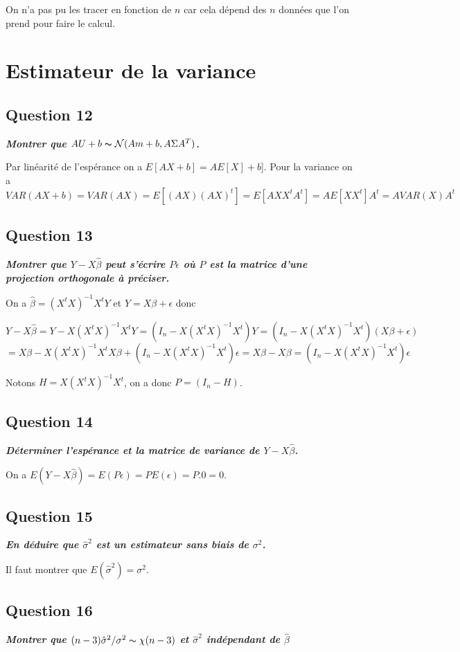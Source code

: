 \documentclass[pdflatex]{article}
\theoremstyle{definition}
\newcommand{\quest}[1]{\textbf{\textit{#1}} \vspace{3mm}}
\begin{document}
\vspace{5mm}
On n'a pas pu les tracer en fonction de $n$ car cela d\'epend des $n$ donn\'ees que l'on prend pour faire le calcul. 

\section*{Estimateur de la variance}
\subsection*{Question 12}
\quest{Montrer que $AU + b \thicksim \mathcal{N}(Am + b, A\Sigma A^T)$.}

Par lin\'earit\'e de l'esp\'erance on a $E[AX+b] = AE[X] + b$]. Pour la variance on a 
$$
VAR(AX+b) = VAR(AX) = E[(AX)(AX)^t] = E[AXX^tA^t] = AE[XX^t]A^t = AVAR(X)A^t
$$

\subsection*{Question 13}
\quest{Montrer que $Y - X\hat{\beta}$ peut s'\'ecrire $P\epsilon$ o\`u $P$ est la matrice d'une projection orthogonale \`a pr\'eciser.}

On a $\hat{\beta} = (X^tX)^{-1}X^tY$ et $Y = X\beta + \epsilon$ donc

$$Y - X\hat{\beta} = Y - X(X^tX)^{-1}X^tY = (I_n - X(X^tX)^{-1}X^t)Y = (I_n - X(X^tX)^{-1}X^t)(X\beta +\epsilon) 
$$
$$
= X\beta - X(X^tX)^{-1}X^tX\beta + (I_n-X(X^tX)^{-1}X^t)\epsilon = X\beta - X\beta = (I_n - X(X^tX)^{-1}X^t)\epsilon
$$

Notons $H = X(X^tX)^{-1}X^t$, on a donc $P = (I_n - H)$.

\subsection*{Question 14}
\quest{D\'eterminer l'esp\'erance et la matrice de variance de $Y - X\hat{\beta}$.}

On a $E(Y-X\hat{\beta}) = E(P\epsilon) = PE(\epsilon) = P.0 = 0$.


\subsection*{Question 15}
\quest{En d\'eduire que $\hat{\sigma}^2$ est un estimateur sans biais de $\sigma^2$.}

Il faut montrer que $E(\hat{\sigma}^2)=\sigma^2$.


\subsection*{Question 16}
\quest{Montrer que $(n-3)\hat{\sigma}^2/\sigma^2 \thicksim \chi (n-3)$ et $\hat{\sigma}^2$ ind\'ependant de $\hat{\beta}$}
\end{document}
